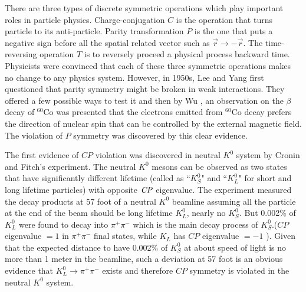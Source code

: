 There are three types of discrete symmetric operations which play important roles in particle physics. Charge-conjugation $\textit{C}$ is the operation that turns particle to its anti-particle. Parity transformation $\textit{P}$  is the one that puts a negative sign before all the spatial related vector such as $\overrightarrow{r} \to -\overrightarrow{r}$. The time-reversing operation $\textit{T}$ is to reversely proceed a physical process backward time.  Physicists were convinced that each of these three symmetric operations makes no change to any physics system. However, in 1950s, Lee and Yang \cite{PhysRev.104.254} first questioned that parity symmetry might be broken in weak interactions. They offered a few possible ways to test it and then by Wu \cite{Wu_exp}, an observation on the $\beta$ decay of $^{60}$Co was presented that the electrons emitted from  $^{60}$Co decay prefers the direction of nuclear spin that can be controlled by the external magnetic field. The violation of $P$ symmetry was discovered by this clear evidence. 

\begin{comment}
\begin{figure}[htbp]
\centering
\texttt{[image: DsBxU.jpg]}
\caption{$^{60}$Co decay violates the parity because of the unbalance of electron emissions\cite{wu_exp}}
\label{fig:Co60}
\end{figure}
\end{comment}

The first evidence of $CP$ violation was discovered in neutral $K^0$ system by Cronin and Fitch's experiment\cite{christenson1964evidence}. The neutral $K^0$ mesons can be observed as two states that have significantly different lifetime (called as ``$K_S^0$" and ``$K_L^0$" for short and long lifetime particles) with opposite $\it{CP}$ eigenvalue. The experiment measured the decay products at 57 foot of a neutral $K^0$ beamline assuming all the particle at the end of the beam should be long lifetime $K_L^0$, nearly no $K_S^0$. But 0.002\% of $K^0_L$ were found to decay into $\pi^+\pi^-$ which is the main decay process of $K_S^0$.($CP$ eigenvalue $=1$ in $\pi^+\pi^-$ final states, while $K_L$ has  $CP$ eigenvalue $=-1$ ). Given that the expected distance to have 0.002\% of $K_S^0$ at about speed of light is no more than 1 meter in the beamline, such a deviation at 57 foot is an obvious evidence that $K_L^0 \to \pi^+\pi^- $ exists and therefore $CP$ symmetry is violated in the neutral $K^0$ system.

